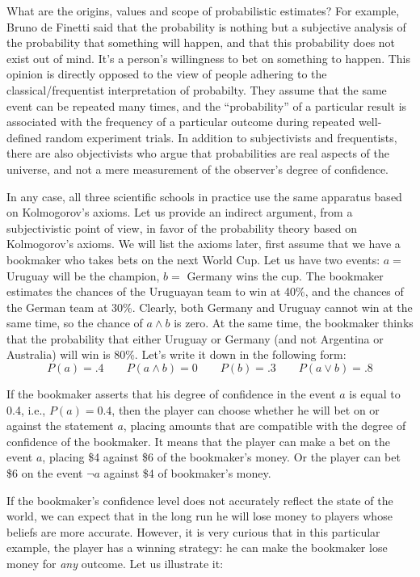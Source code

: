 \documentclass[notitlepage,oneside]{book}
\begin{document}
What are the origins, values and scope of probabilistic estimates? 
For example, Bruno de Finetti said that the probability is nothing but a subjective analysis of the probability that something will happen, 
and that this probability does not exist out of mind. 
It's a person's willingness to bet on something to happen. 
This opinion is directly opposed to the view of people adhering to the classical/frequentist interpretation of probabilty.
They assume that the same event can be repeated many times, and the ``probability'' of a particular result is associated with 
the frequency of a particular outcome during repeated well-defined random experiment trials.
In addition to subjectivists and frequentists, there are also objectivists who argue that probabilities are real aspects of the universe, 
and not a mere measurement of the observer's degree of confidence.

In any case, all three scientific schools in practice use the same apparatus based on Kolmogorov's axioms.
Let us provide an indirect argument, from a subjectivistic point of view, in favor of the probability theory based on Kolmogorov's axioms.
We will list the axioms later, first assume that we have a bookmaker who takes bets on the next World Cup. 
Let us have two events: $a=$ Uruguay will be the champion, $b=$ Germany wins the cup.
The bookmaker estimates the chances of the Uruguayan team to win at 40\%, and the chances of the German team at 30\%.
Clearly, both Germany and Uruguay cannot win at the same time, so the chance of $a\wedge b$ is zero. 
At the same time, the bookmaker thinks that the probability that either Uruguay or Germany (and not Argentina or Australia) will win is 80\%.
Let's write it down in the following form:
$$P(a) = .4  \qquad  P(a\wedge b) = 0 \qquad P(b) = .3 \qquad P(a\vee b) = .8$$

If the bookmaker asserts that his degree of confidence in the event $a$ is equal to 0.4, i.e., $P(a) = 0.4$, 
then the player can choose whether he will bet on or against the statement $a$,
placing amounts that are compatible with the degree of confidence of the bookmaker.
It means that the player can make a bet on the event $a$, placing \$4 against \$6 of the bookmaker's money.
Or the player can bet \$6 on the event $\neg a$ against \$4 of bookmaker's money.

If the bookmaker's confidence level does not accurately reflect the state of the world, 
we can expect that in the long run he will lose money to players whose beliefs are more accurate.
However, it is very curious that in this particular example, the player has a winning strategy: he can make the bookmaker lose money for \textit{any} outcome.
Let us illustrate it:
\end{document}
